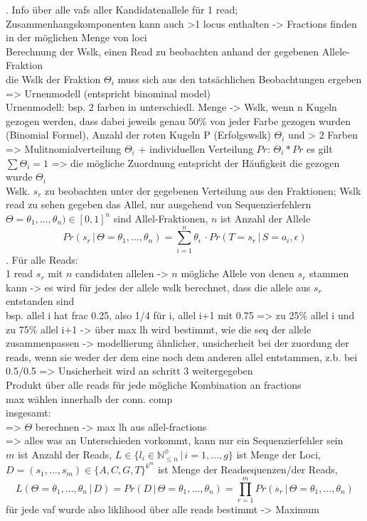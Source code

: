 . Info über alle vafs aller Kandidatenallele für 1 read; Zusammenhangskomponenten kann auch >1 locus enthalten -> Fractions finden in der möglichen Menge von loci \\
Berechnung der Wslk, einen Read zu beobachten anhand der gegebenen Allele-Fraktion\\
die Wslk der Fraktion $\Theta_{i}$ muss sich aus den tatsächlichen Beobachtungen ergeben => Urnenmodell (entspricht binominal model)\\
Urnenmodell: bsp. 2 farben in unterschiedl. Menge -> Wslk, wenn n Kugeln gezogen werden, dass dabei jeweils genau 50\% von jeder Farbe gezogen wurden (Binomial Formel), Anzahl der roten Kugeln P (Erfolgswslk) $\Theta_{i}$ und  > 2 Farben => Mulitnomialverteilung $\Theta_{i}$ + individuellen Verteilung $Pr$: $\Theta_{i} * Pr$
es gilt $\sum \Theta_{i} = 1$ => die mögliche Zuordnung entspricht der Häufigkeit die gezogen wurde $\Theta_{i}$ \\
Wslk. $ s_{r} $ zu beobachten unter der gegebenen Verteilung aus den Fraktionen; Wslk read zu sehen gegeben das Allel, nur ausgehend von Sequenzierfehlern \\
$\Theta=\theta_{1},\dots,\theta_{n}) \in [0,1]^n $ sind Allel-Fraktionen, $n$ ist Anzahl der Allele \\
\begin{equation} \label{eqn:2-xxx2}
\tag{2-xxx2}
Pr(s_{r} \, | \, \Theta=\theta_{1},\dots,\theta_{n}) = \sum_{i=1}^{n}\theta_{i} \, \cdotp Pr(T=s_{r} \, | \, S=a_{i}, \epsilon)
\end{equation}
. Für alle Reads: \\
1 read $s_{r}$ mit $n$ candidaten allelen -> $n$ mögliche Allele von denen $s_{r}$ stammen kann -> es wird für jedes der allele wslk berechnet, dass die allele aus $s_{r}$ entstanden sind\\
bsp. allel i hat frac 0.25, also 1/4 für i, allel i+1 mit 0.75 => zu 25\% allel i und zu 75\% allel i+1 -> über max lh wird bestimmt, wie die seq der allele zusammenpassen -> modellierung ähnlicher,  unsicherheit bei der zuordung der reads, wenn sie weder der dem eine noch dem anderen allel entstammen, z.b. bei 0.5/0.5 => Unsicherheit wird an schritt 3 weitergegeben \\
Produkt über alle reads für jede mögliche Kombination an fractions \\
max wählen innerhalb der conn. comp\\
insgesamt:\\
=> $\Theta$ berechnen -> max lh aus allel-fractions\\
=> alles was an Unterschieden vorkommt, kann nur ein Sequenzierfehler sein\\
$m$ ist Anzahl der Reads, $L \in \{l_{i} \in \mathds{N}_{\leq n}^\phi \, | \, i=1, \dots, g\}$ ist Menge der Loci, $D = (s_{1}, \dots, s_{m}) \in \{A,C, G, T\}^{k^m}$ ist Menge der Readsequenzen/der Reads,
\begin{equation} \label{eqn:2-xxx3}
\tag{2-xxx3}
L(\Theta=\theta_{1},\dots,\theta_{n} \, | \, D) = Pr(D \, | \, \Theta=\theta_{1},\dots,\theta_{n}) = \prod_{r=1}^{m}Pr (s_{r} \, | \, \Theta=\theta_{1},\dots,\theta_{n})
\end{equation}
für jede vaf wurde also liklihood über alle reads bestimmt -> Maximum 
